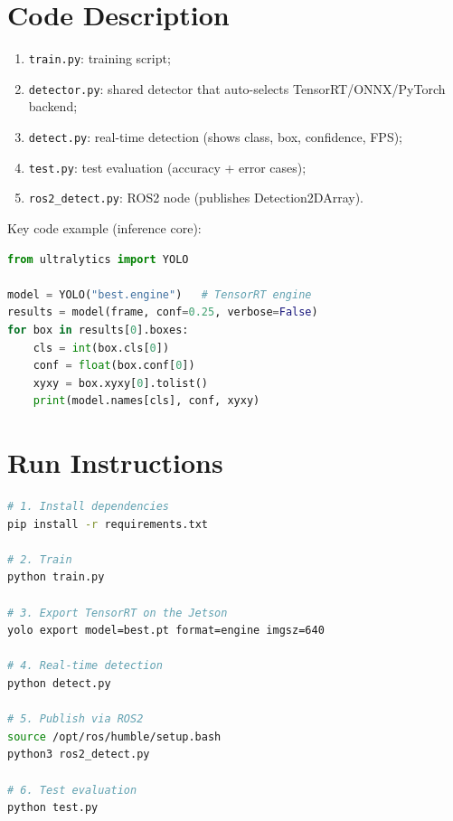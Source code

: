 \documentclass[12pt, a4paper]{article}
\begin{document}
\section{Code Description}
\begin{enumerate}[label=\arabic*., leftmargin=2em]
    \item \texttt{train.py}: training script;
    \item \texttt{detector.py}: shared detector that auto-selects TensorRT/ONNX/PyTorch backend;
    \item \texttt{detect.py}: real-time detection (shows class, box, confidence, FPS);
    \item \texttt{test.py}: test evaluation (accuracy + error cases);
    \item \texttt{ros2\_detect.py}: ROS2 node (publishes Detection2DArray).
\end{enumerate}

Key code example (inference core):
\begin{lstlisting}[language=Python, caption={Detection inference}]
from ultralytics import YOLO

model = YOLO("best.engine")   # TensorRT engine
results = model(frame, conf=0.25, verbose=False)
for box in results[0].boxes:
    cls = int(box.cls[0])
    conf = float(box.conf[0])
    xyxy = box.xyxy[0].tolist()
    print(model.names[cls], conf, xyxy)
\end{lstlisting}

\section{Run Instructions}
\begin{lstlisting}[language=bash, caption={Full workflow}]
# 1. Install dependencies
pip install -r requirements.txt

# 2. Train
python train.py

# 3. Export TensorRT on the Jetson
yolo export model=best.pt format=engine imgsz=640

# 4. Real-time detection
python detect.py

# 5. Publish via ROS2
source /opt/ros/humble/setup.bash
python3 ros2_detect.py

# 6. Test evaluation
python test.py
\end{lstlisting}

\end{document}
